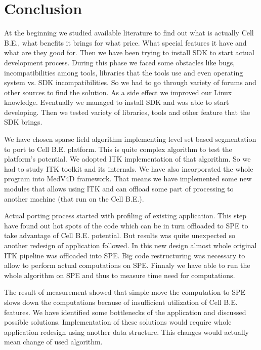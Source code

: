 \chapter{Conclusion}

\par
At the beginning we studied available literature to find out what is actually Cell B.E., what benefits it brings for what price.
What special features it have and what are they good for.
Then we have been trying to install SDK to start actual development process.
During this phase we faced some obstacles like bugs, incompatibilities among tools, libraries that the tools use and even operating system vs. SDK incompatibilities.
So we had to go through variety of forums and other sources to find the solution.
As a side effect we improved our Linux knowledge.
Eventually we managed to install SDK and was able to start developing.
Then we tested variety of libraries, tools and other feature that the SDK brings.

\par
We have chosen sparse field algorithm implementing level set based segmentation to port to Cell B.E. platform.
This is quite complex algorithm to test the platform's potential.
We adopted ITK implementation of that algorithm.
So we had to study ITK toolkit and its internals.
We have also incorporated the whole program into MedV4D framework.
That means we have implemented some new modules that allows using ITK and can offload some part of processing to another machine (that run on the Cell B.E.).

\par
Actual porting process started with profiling of existing application.
This step have found out hot spots of the code which can be in turn offloaded to SPE to take advantage of Cell B.E. potential.
But results was quite unexpected so another redesign of application followed.
In this new design almost whole original ITK pipeline was offloaded into SPE.
Big code restructuring was necessary to allow to perform actual computations on SPE.
Finnaly we have able to run the whole algorithm on SPE and thus to measure time need for computations.

\par
The result of measurement showed that simple move the computation to SPE slows down the computations because of insufficient utilization of Cell B.E. features.
We have identified some bottlenecks of the application and discussed possible solutions.
Implementation of these solutions would require whole application redesign using another data structure.
This changes would actually mean change of used algorithm.

